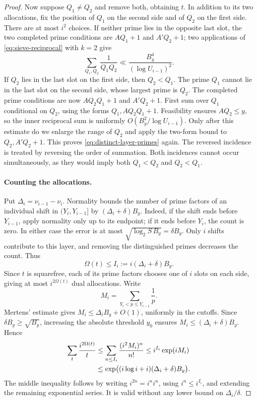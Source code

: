 \begin{proof}
Now suppose $Q_1\ne Q_2$ and remove both, obtaining $t$.
In addition to its two allocations, fix the position of $Q_1$ on
the second side and of $Q_2$ on the first side.  There are at most
$i^2$ choices.  If neither prime lies in the opposite last slot,
the two completed prime conditions are
$AQ_1+1$ and $A'Q_2+1$; two applications of
\eqref{eq:sieve-reciprocal} with $k=2$ give
\begin{equation}\label{eq:distinct-layer-primes}
 \sum_{Q_1,Q_2}\frac1{Q_1Q_2}
 \ll\frac{B_y^4}{(\log U_{i-1})^2}.
\end{equation}
If $Q_2$ lies in the last slot on the first side, then $Q_2<Q_1$.
The prime $Q_1$ cannot lie in the last slot on the second side,
whose largest prime is $Q_2$.  The completed prime conditions are
now $AQ_2Q_1+1$ and $A'Q_2+1$.  First sum over $Q_1$ conditional
on $Q_2$, using the forms $Q_1,AQ_2Q_1+1$.  Feasibility ensures
$AQ_2\le y$, so the inner reciprocal sum is uniformly
$O(B_y^2/\log U_{i-1})$.  Only after this estimate do we enlarge
the range of $Q_2$ and apply the two-form bound to
$Q_2,A'Q_2+1$.  This proves \eqref{eq:distinct-layer-primes} again.
The reversed incidence is treated by reversing the order of
summation.  Both incidences cannot occur simultaneously, as they
would imply both $Q_1<Q_2$ and $Q_2<Q_1$.

\paragraph{Counting the allocations.}
Put $\Delta_i=\nu_{i-1}-\nu_i$.  Normality bounds the number of
prime factors of an individual shift in $(Y_i,Y_{i-1}]$ by
$(\Delta_i+\delta)B_y$.  Indeed, if the shift ends before
$Y_{i-1}$, apply normality only up to its endpoint; if it ends
before $Y_i$, the count is zero.  In either case the error is at
most $\sqrt{\log_2 S\,B_y}=\delta B_y$.
Only $i$ shifts contribute to this layer, and removing the
distinguished primes decreases the count.  Thus
\[
 \Omega(t)\le I_i:=i(\Delta_i+\delta)B_y.
\]
Since $t$ is squarefree, each of its prime factors chooses one of
$i$ slots on each side, giving at most $i^{2\Omega(t)}$ dual
allocations.  Write
\[
 M_i=\sum_{Y_i<p\le Y_{i-1}}\frac1p.
\]
Mertens' estimate gives $M_i\le\Delta_i B_y+O(1)$, uniformly in
the cutoffs.  Since $\delta B_y\ge\sqrt{B_y}$, increasing the
absolute threshold $y_0$ ensures
$M_i\le(\Delta_i+\delta)B_y$.  Hence
\begin{align}
 \sum_t\frac{i^{2\Omega(t)}}t
 &\le\sum_{n\le I_i}\frac{(i^2M_i)^n}{n!}
 \le i^{I_i}\exp(iM_i)\notag\\
 &\le\exp\bigl((i\log i+i)(\Delta_i+\delta)B_y\bigr).
 \label{eq:allocation-entropy}
\end{align}
The middle inequality follows by writing $i^{2n}=i^ni^n$,
using $i^n\le i^{I_i}$, and extending the remaining exponential
series.  It is valid without any lower bound on
$\Delta_i/\delta$.


\end{proof}
